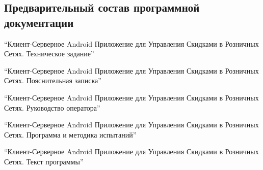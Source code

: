 \subsection{Предварительный состав программной документации}
\begin{my_enumerate}
    \item ``Клиент-Серверное Android Приложение для Управления Скидками в Розничных Сетях. Техническое 
    задание''
    \item ``Клиент-Серверное Android Приложение для Управления Скидками в Розничных Сетях. 
    Пояснительная записка''
    \item ``Клиент-Серверное Android Приложение для Управления Скидками в Розничных Сетях. 
    Руководство оператора''
    \item ``Клиент-Серверное Android Приложение для Управления Скидками в Розничных Сетях. Программа и 
    методика испытаний''
    \item ``Клиент-Серверное Android Приложение для Управления Скидками в Розничных Сетях. Текст 
    программы''
\end{my_enumerate}

